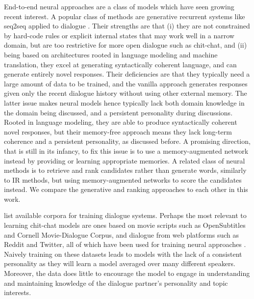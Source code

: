 \documentclass[11pt,a4paper]{article}
\begin{document}
End-to-end neural approaches are a class of models which have seen growing recent interest.  
A popular class of methods are
generative recurrent systems like seq2seq applied to dialogue \citep{sutskever2014sequence,vinyals2015neural,sordoni2015neural,li2016deep,serban2017hierarchical}.
\ifarxiv
Their strengths are that (i) they are not constrained by hard-code rules or explicit internal states that may work well in a narrow domain, but are too restrictive for more open dialogue such as chit-chat, and (ii) being based on architectures rooted in language modeling and machine translation, they excel at generating syntactically coherent language, and can generate entirely novel responses.
Their deficiencies are that they typically need a large amount of data to be trained, 
and the vanilla approach generates responses given only the recent dialogue history without using other external memory. The latter issue makes neural models  hence typically lack both domain knowledge in the domain being discussed, and a persistent personality during discussions.
\else
Rooted in language modeling, they are able to produce syntactically coherent novel responses, but
their memory-free approach means they lack long-term coherence and a persistent personality, as discussed before. 
\fi
A promising direction, that is still in its infancy, to fix this issue is to use 
a memory-augmented network instead \citep{memn2n,dodge2015evaluating} 
by providing or learning appropriate  memories.
\ifarxiv
A related class of neural methods is to retrieve and rank candidates
rather than generate words,
 similarly to IR methods, but using memory-augmented networks to score the candidates instead. We compare the generative and ranking approaches to each other in this work.
\fi

 list available corpora for training dialogue systems.
Perhaps the most relevant to learning chit-chat models are ones based on movie
scripts such as OpenSubtitles and Cornell Movie-Dialogue Corpus, and dialogue from web platforms such as Reddit and Twitter, all of which have  been used for training neural
approaches \citep{vinyals2015neural,dodge2015evaluating,li2016deep,serban2017hierarchical}. Naively training on these datasets leads to models with the lack of a consistent personality as they will learn a model averaged over many different speakers. Moreover, the data does little to encourage the model to engage in understanding and maintaining knowledge of the dialogue partner's personality and topic interests.
\end{document}
